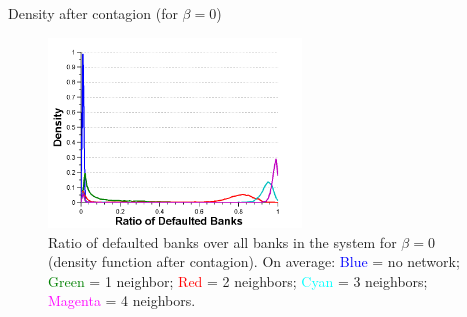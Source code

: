 \documentclass{beamer}
\begin{document}
\begin{frame}{Density after contagion (for $\beta=0$)}
	\begin{figure}[ht]
		\centering
		\includegraphics[width=0.6\textwidth]{images/all}
		\caption{Ratio of defaulted banks over all banks in the system for $\beta=0$ (density function after contagion). On average: \textcolor{blue}{Blue} = no network; \textcolor{green}{Green} = 1 neighbor; \textcolor{red}{Red} = 2 neighbors; \textcolor{cyan}{Cyan} = 3 neighbors; \textcolor{magenta}{Magenta} = 4 neighbors.}
	\end{figure}
\end{frame}
\end{document}

